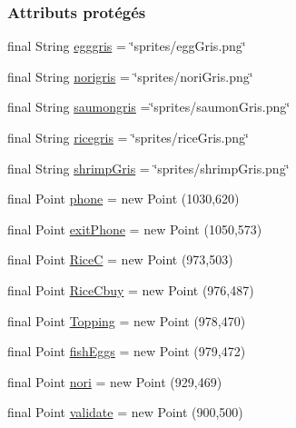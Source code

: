 \subsubsection*{Attributs protégés}
\begin{DoxyCompactItemize}
\item 
final String \hyperlink{classTestSushi_1_1src_1_1Suchi_1_1Recette_a14892e43d9ed57350effdf3ed1bddb8a}{egggris} = \char`\"{}sprites/egg\+Gris.\+png\char`\"{}
\item 
final String \hyperlink{classTestSushi_1_1src_1_1Suchi_1_1Recette_a774959efa525787a162778df37770b7c}{norigris} = \char`\"{}sprites/nori\+Gris.\+png\char`\"{}
\item 
final String \hyperlink{classTestSushi_1_1src_1_1Suchi_1_1Recette_aea59cc2a5f6bc21ec36690a5bf1eb38c}{saumongris} =\char`\"{}sprites/saumon\+Gris.\+png\char`\"{}
\item 
final String \hyperlink{classTestSushi_1_1src_1_1Suchi_1_1Recette_a616939eea675e05aa6d7ec62fd90f461}{ricegris} = \char`\"{}sprites/rice\+Gris.\+png\char`\"{}
\item 
final String \hyperlink{classTestSushi_1_1src_1_1Suchi_1_1Recette_ac1b1b9b91dba95a9d0df2f6e59f04a59}{shrimp\+Gris} = \char`\"{}sprites/shrimp\+Gris.\+png\char`\"{}
\item 
final Point \hyperlink{classTestSushi_1_1src_1_1Suchi_1_1Recette_a45e48b1a85957813f1a747df04923b08}{phone} = new Point (1030,620)
\item 
final Point \hyperlink{classTestSushi_1_1src_1_1Suchi_1_1Recette_aecc6de3619013f1fb5f506c1e4e9ad7b}{exit\+Phone} = new Point (1050,573)
\item 
final Point \hyperlink{classTestSushi_1_1src_1_1Suchi_1_1Recette_ab502e1d023a0bd3fadfc714e1babc728}{Rice\+C} = new Point (973,503)
\item 
final Point \hyperlink{classTestSushi_1_1src_1_1Suchi_1_1Recette_a890dce3bb5d54a700fa7bebc2496e931}{Rice\+Cbuy} = new Point (976,487)
\item 
final Point \hyperlink{classTestSushi_1_1src_1_1Suchi_1_1Recette_ab7575f64998864f6b053859c18380f58}{Topping} = new Point (978,470)
\item 
final Point \hyperlink{classTestSushi_1_1src_1_1Suchi_1_1Recette_a2f5cec48c186dc52c3d990df66f3a8cf}{fish\+Eggs} = new Point (979,472)
\item 
final Point \hyperlink{classTestSushi_1_1src_1_1Suchi_1_1Recette_a4f3e62b4ab32fcc5d8b6875996f47618}{nori} = new Point (929,469)
\item 
final Point \hyperlink{classTestSushi_1_1src_1_1Suchi_1_1Recette_a9c491e7f09a444817e433e54923e6bca}{validate} = new Point (900,500)

\end{DoxyCompactItemize}
